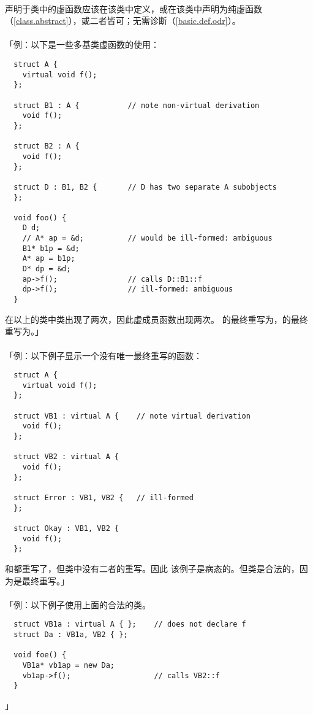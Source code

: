 \paragraph{}
声明于类中的虚函数应该在该类中定义，或在该类中声明为纯虚函数
（\ref{class.abstract}），或二者皆可；无需诊断（\ref{basic.def.odr}）。

\paragraph{}
「例：以下是一些多基类虚函数的使用：
\begin{lstlisting}
  struct A {
    virtual void f();
  };

  struct B1 : A {           // note non-virtual derivation
    void f();
  };

  struct B2 : A {
    void f();
  };

  struct D : B1, B2 {       // D has two separate A subobjects
  };

  void foo() {
    D d;
    // A* ap = &d;          // would be ill-formed: ambiguous
    B1* b1p = &d;
    A* ap = b1p;
    D* dp = &d;
    ap->f();                // calls D::B1::f
    dp->f();                // ill-formed: ambiguous
  }
\end{lstlisting}
在以上的类中类出现了两次，因此虚成员函数出现两次。
的最终重写为，的最终重写为。」

\paragraph{}
「例：以下例子显示一个没有唯一最终重写的函数：
\begin{lstlisting}
  struct A {
    virtual void f();
  };

  struct VB1 : virtual A {    // note virtual derivation
    void f();
  };

  struct VB2 : virtual A {
    void f();
  };

  struct Error : VB1, VB2 {   // ill-formed
  };

  struct Okay : VB1, VB2 {
    void f();
  };
\end{lstlisting}
和都重写了，但类中没有二者的重写。因此
该例子是病态的。但类是合法的，因为是最终重写。」

\paragraph{}
「例：以下例子使用上面的合法的类。
\begin{lstlisting}
  struct VB1a : virtual A { };    // does not declare f
  struct Da : VB1a, VB2 { };

  void foe() {
    VB1a* vb1ap = new Da;
    vb1ap->f();                   // calls VB2::f
  }
\end{lstlisting}」

